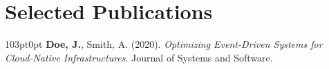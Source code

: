 \section{Selected Publications}
\begin{adjustwidth}{103pt}{0pt}
    \noindent \textbf{Doe, J.}, Smith, A. (2020). \textit{Optimizing Event-Driven Systems for Cloud-Native Infrastructures}. Journal of Systems and Software.
\end{adjustwidth}
